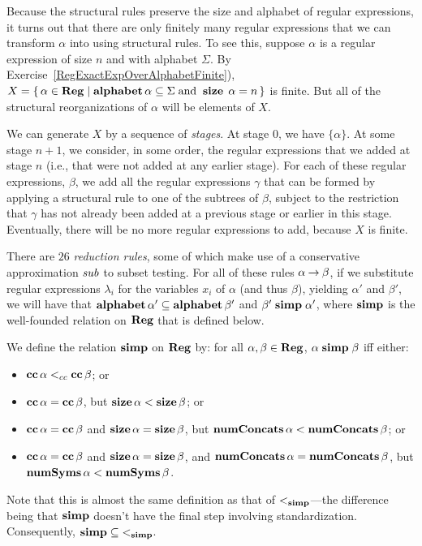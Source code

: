 Because the structural rules preserve the size and alphabet of regular
expressions, it turns out that there are only finitely many regular
expressions that we can transform $\alpha$ into using structural
rules. To see this, suppose $\alpha$ is a regular expression of size
$n$ and with alphabet $\Sigma$. By
Exercise~\ref{RegExactExpOverAlphabetFinite}),
$X = \{ \, \alpha\in\mathbf{Reg} \mid \mathbf{alphabet}\,\alpha\subseteq\Sigma \;\allowbreak\mbox{and}\allowbreak\;
  \mathrel{\mathbf{size}}\,\alpha = n \, \}$ is finite.  But all of the structural
reorganizations of $\alpha$ will be elements of $X$.

We can generate $X$ by a sequence of \emph{stages}.  At stage $0$, we
have $\{\alpha\}$. At some stage $n+1$, we consider, in some order,
the regular expressions that we added at stage $n$ (i.e., that were
not added at any earlier stage). For each of these regular
expressions, $\beta$, we add all the regular expressions $\gamma$ that
can be formed by applying a structural rule to one of the subtrees of
$\beta$, subject to the restriction that $\gamma$ has not already been
added at a previous stage or earlier in this stage.  Eventually, there
will be no more regular expressions to add, because $X$ is finite.

There are $26$ \emph{reduction rules}, some of which make use of a
%
%
%
conservative approximation ${\it sub}$ to subset testing. For all of these
rules $\alpha\mathbin{\to}\beta$, if we substitute regular expressions
$\lambda_i$ for the variables $x_i$ of $\alpha$ (and thus $\beta$),
yielding $\alpha'$ and $\beta'$, we will have that
$\mathbf{alphabet}\,\alpha'\subseteq\mathbf{alphabet}\,\beta'$ and $\beta'\mathrel{\mathbf{simp}}\alpha'$,
where $\mathrel{\mathbf{simp}}$ is the well-founded relation on $\mathbf{Reg}$ that is defined
below.

We define the relation $\mathrel{\mathbf{simp}}$ on $\mathbf{Reg}$ by: for all $\alpha,\beta\in
\mathbf{Reg}$, $\alpha\mathrel{\mathbf{simp}}\beta$ iff either:
\begin{itemize}
\item $\mathbf{cc}\,\alpha\mathrel{<_{cc}}\mathbf{cc}\,\beta$; or

\item $\mathbf{cc}\,\alpha = \mathbf{cc}\,\beta$, but $\mathbf{size}\,\alpha < \mathbf{size}\,\beta$; or

\item $\mathbf{cc}\,\alpha = \mathbf{cc}\,\beta$ and $\mathbf{size}\,\alpha = \mathbf{size}\,\beta$,
  but $\mathbf{numConcats}\,\alpha < \mathbf{numConcats}\,\beta$; or

\item $\mathbf{cc}\,\alpha = \mathbf{cc}\,\beta$ and $\mathbf{size}\,\alpha =
  \mathbf{size}\,\beta$, and $\mathbf{numConcats}\,\alpha = \mathbf{numConcats}\,\beta$, but
  $\mathbf{numSyms}\,\alpha < \mathbf{numSyms}\,\beta$.
\end{itemize}
Note that this is almost the same definition as that of
$\mathrel{<_{\mathbf{simp}}}$---the difference being that $\mathrel{\mathbf{simp}}$ doesn't have the final
step involving standardization. Consequently, ${\mathrel{\mathbf{simp}}}\subseteq{\mathrel{<_{\mathbf{simp}}}}$.

